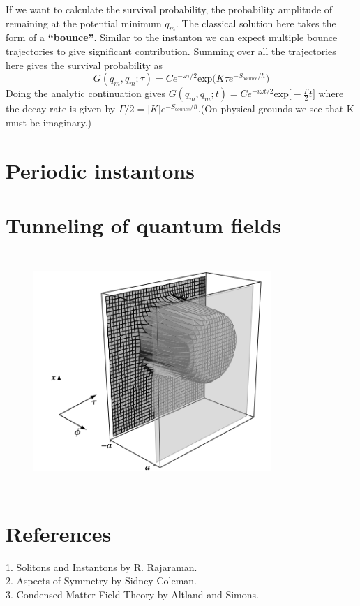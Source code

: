 \documentclass[a4paper, 12pt]{article}
\begin{document}
If we want to calculate the survival probability, the probability amplitude of remaining at the potential minimum $q_m$. The classical solution here takes the form of a \textbf{``bounce''}. Similar to the instanton we can expect multiple bounce trajectories to give significant contribution. Summing over all the trajectories here gives the survival probability as
\begin{equation}
G(q_m,q_m;\tau) = Ce^{-\omega\tau /2} \mathrm{exp}\Big(K \tau e^{-S_{bounce}/\hbar}\Big)
\end{equation}
Doing the analytic continuation gives $G(q_m,q_m;t) = Ce^{-i\omega t /2} \mathrm{exp}\big[-\frac{\Gamma}{2}t\big]$ where the decay rate is given by $\Gamma /2 = |K| e^{-S_{bounce}/\hbar}$.(On physical grounds we see that K must be imaginary.)
\section {Periodic instantons}

\section {Tunneling of quantum fields}

\begin{figure}[ht]
    \centering
    \includegraphics[height=9cm, width=9cm]{fig6}
\end{figure}

  \section {References}
1. Solitons and Instantons by R. Rajaraman.\\
2. Aspects of Symmetry by Sidney Coleman.\\
3. Condensed Matter Field Theory by Altland and Simons.
\end{document}
